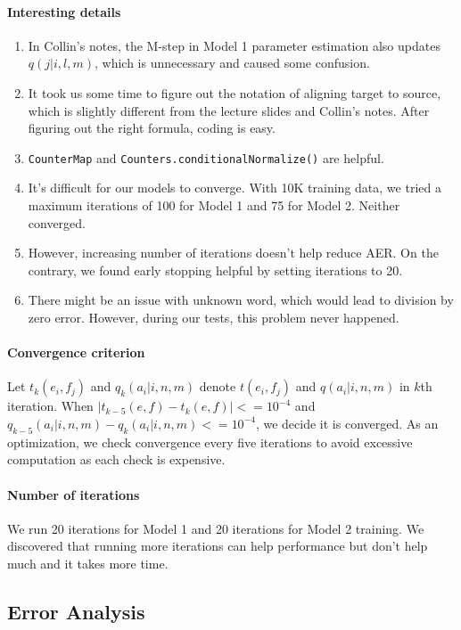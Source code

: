 \documentclass{article}
\begin{document}
\paragraph{Interesting details}
\begin{enumerate}
\item In Collin's notes, the M-step in Model 1 parameter estimation also updates $q(j|i,l,m)$, which is unnecessary and caused some confusion.
\item It took us some time to figure out the notation of aligning target to source, which is slightly different from the lecture slides and Collin's notes. After figuring out the right formula, coding is easy.
\item \texttt{CounterMap} and \texttt{Counters.conditionalNormalize()} are helpful.
\item It's difficult for our models to converge. With 10K training data, we tried a maximum iterations of 100 for Model 1 and 75 for Model 2. Neither converged.
\item However, increasing number of iterations doesn't help reduce AER. On the contrary, we found early stopping helpful by setting iterations to 20.
\item There might be an issue with unknown word, which would lead to division by zero error. However, during our tests, this problem never happened.
\end{enumerate}

\paragraph{Convergence criterion} Let $t_{k}(e_i, f_j)$ and $q_{k}(a_i|i, n, m)$ denote $t(e_i, f_j)$ and $q(a_i|i, n, m)$ in $k$th iteration. When $|t_{k - 5}(e, f) - t_{k}(e, f)| <= 10^{-4}$ and $q_{k -5}(a_i|i, n, m) - q_{k}(a_i|i, n, m) <= 10^{-4}$, we decide it is converged. As an optimization, we check convergence every five iterations to avoid excessive computation as each check is expensive.
\paragraph{Number of iterations} We run 20 iterations for Model 1 and 20 iterations for Model 2 training. We discovered that running more iterations can help performance but don't help much and it takes more time.

\subsection{Error Analysis}
\end{document}
